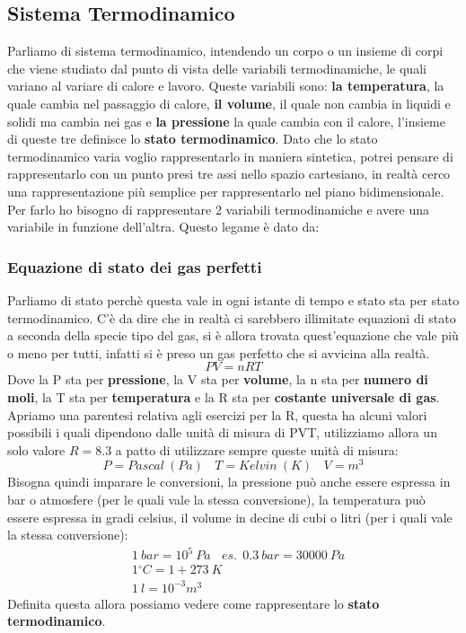 \documentclass{article}
\numberwithin{equation}{subsection}
\begin{document}
\subsection{Sistema Termodinamico}
Parliamo di sistema termodinamico, intendendo un corpo o un insieme di corpi che viene studiato dal punto di vista delle variabili termodinamiche, le quali variano al variare di calore e lavoro. Queste variabili sono: \textbf{la temperatura}, la quale cambia nel passaggio di calore, \textbf{il volume}, il quale non cambia in liquidi e solidi ma cambia nei gas e \textbf{la pressione} la quale cambia con il calore, l'insieme di queste tre definisce lo \textbf{stato termodinamico}. Dato che lo stato termodinamico varia voglio rappresentarlo in maniera sintetica, potrei pensare di rappresentarlo con un punto presi tre assi nello spazio cartesiano, in realtà cerco una rappresentazione più semplice per rappresentarlo nel piano bidimensionale. Per farlo ho bisogno di rappresentare 2 variabili termodinamiche e avere una variabile in funzione dell'altra. Questo legame è dato da:
\subsubsection{Equazione di stato dei gas perfetti}
Parliamo di stato perchè questa vale in ogni istante di tempo e stato sta per stato termodinamico. C'è da dire che in realtà ci sarebbero illimitate equazioni di stato a seconda della specie tipo del gas, si è allora trovata quest'equazione che vale più o meno per tutti, infatti si è preso un gas perfetto che si avvicina alla realtà.
\begin{equation}
    PV=nRT
\end{equation}
Dove la P sta per \textbf{pressione}, la V sta per \textbf{volume}, la n sta per \textbf{numero di moli}, la T sta per \textbf{temperatura} e la R sta per \textbf{costante universale di gas}. Apriamo una parentesi relativa agli esercizi per la R, questa ha alcuni valori possibili i quali dipendono dalle unità di misura di PVT, utilizziamo allora un solo valore $R=8.3$ a patto di utilizzare sempre queste unità di misura:
\begin{equation}
    P=Pascal \  (Pa) \ \ \ \ T=Kelvin \ (K) \ \ \ \ V=m^3
\end{equation}
Bisogna quindi imparare le conversioni, la pressione può anche essere espressa in bar o atmosfere (per le quali vale la stessa conversione), la temperatura può essere espressa in gradi celsius, il volume in decine di cubi o litri (per i quali vale la stessa conversione):
\begin{align}
    & 1 \ bar=10^5 \ Pa \ \ \ \ es. \ \ 0.3 \ bar=30 000 \ Pa \\
    & 1 {}^{\circ}C = 1 + 273 \ K \\
    & 1 \ l = 10^{-3} m^3
\end{align}
Definita questa allora possiamo vedere come rappresentare lo \textbf{stato termodinamico}.
\end{document}
